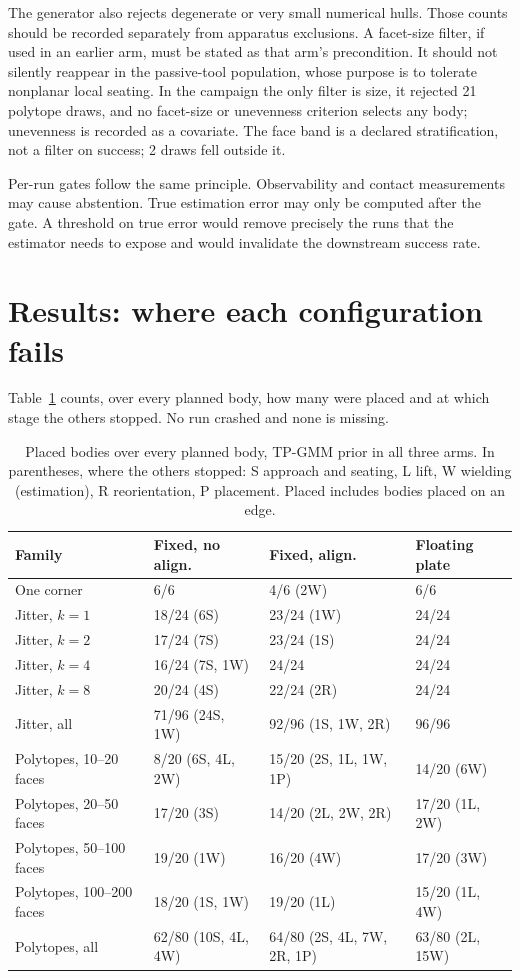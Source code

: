 The generator also rejects degenerate or very small numerical hulls. Those counts should be recorded separately from apparatus exclusions. A facet-size filter, if used in an earlier arm, must be stated as that arm's precondition. It should not silently reappear in the passive-tool population, whose purpose is to tolerate nonplanar local seating. In the campaign the only filter is size, it rejected 21 polytope draws, and no facet-size or unevenness criterion selects any body; unevenness is recorded as a covariate. The face band is a declared stratification, not a filter on success; 2 draws fell outside it.

Per-run gates follow the same principle. Observability and contact measurements may cause abstention. True estimation error may only be computed after the gate. A threshold on true error would remove precisely the runs that the estimator needs to expose and would invalidate the downstream success rate.

\section{Results: where each configuration fails}
\label{sec:geo-results}

Table~\ref{tab:geo-mortality} counts, over every planned body, how many were placed and at which stage the others stopped. No run crashed and none is missing.

\begin{table}[htbp]\centering\small
\begin{tabular}{@{}llll@{}}\toprule
Family & Fixed, no align. & Fixed, align. & Floating plate\\
\midrule
One corner & 6/6 & 4/6 (2W) & 6/6 \\
Jitter, $k=1$ & 18/24 (6S) & 23/24 (1W) & 24/24 \\
Jitter, $k=2$ & 17/24 (7S) & 23/24 (1S) & 24/24 \\
Jitter, $k=4$ & 16/24 (7S, 1W) & 24/24 & 24/24 \\
Jitter, $k=8$ & 20/24 (4S) & 22/24 (2R) & 24/24 \\
Jitter, all & 71/96 (24S, 1W) & 92/96 (1S, 1W, 2R) & 96/96 \\
Polytopes, 10--20 faces & 8/20 (6S, 4L, 2W) & 15/20 (2S, 1L, 1W, 1P) & 14/20 (6W) \\
Polytopes, 20--50 faces & 17/20 (3S) & 14/20 (2L, 2W, 2R) & 17/20 (1L, 2W) \\
Polytopes, 50--100 faces & 19/20 (1W) & 16/20 (4W) & 17/20 (3W) \\
Polytopes, 100--200 faces & 18/20 (1S, 1W) & 19/20 (1L) & 15/20 (1L, 4W) \\
Polytopes, all & 62/80 (10S, 4L, 4W) & 64/80 (2S, 4L, 7W, 2R, 1P) & 63/80 (2L, 15W) \\
\bottomrule\end{tabular}
\caption{Placed bodies over every planned body, TP-GMM prior in all three arms. In parentheses, where the others stopped: S approach and seating, L lift, W wielding (estimation), R reorientation, P placement. Placed includes bodies placed on an edge.}
\label{tab:geo-mortality}
\end{table}

